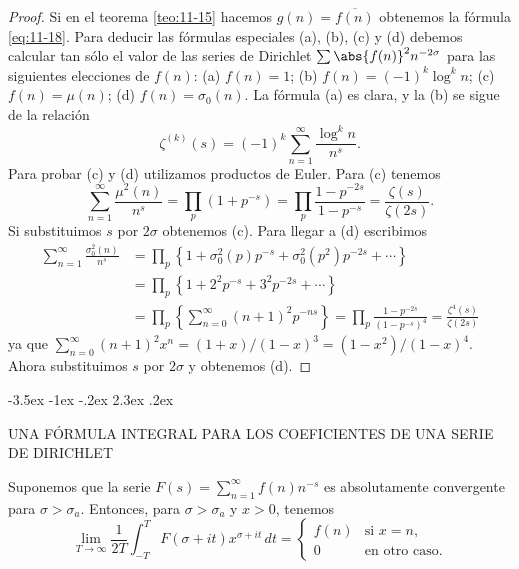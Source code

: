 \documentclass[12pt,a4paper]{book}
\makeatletter
\renewcommand\section{\@startsection{section}{1}{\z@}%
  {-3.5ex \@plus -1ex \@minus -.2ex}%
  {2.3ex \@plus .2ex}%
  {\normalfont\Large\bfseries\raggedright}}
\makeatother
\begin{document}
    \begin{proof}
        Si en el teorema \ref{teo:11-15} hacemos $g(n)=\overline{f(n)}$ obtenemos la fórmula
        \eqref{eq:11-18}. Para deducir las fórmulas especiales (a), (b), (c) y (d) debemos
        calcular tan sólo el valor de las series de Dirichlet $\sum\abs{f(n)}^{2}n^{-2\sigma}$
        para las siguientes elecciones de $f(n)$: (a) $f(n)=1$; (b) $f(n)=(-1)^{k}\log^{k}n$; (c)
        $f(n)=\mu(n)$; (d) $f(n)=\sigma_{0}(n)$. La fórmula (a) es clara, y la (b) se sigue de
        la relación
        \begin{equation*}
            \zeta^{(k)}(s)=(-1)^{k}\sum_{n=1}^{\infty}\frac{\log^{k}n}{n^{s}}.
        \end{equation*}
        Para probar (c) y (d) utilizamos productos de Euler. Para (c) tenemos
        \begin{equation*}
            \sum_{n=1}^{\infty}\frac{\mu^{2}(n)}{n^{s}}=\prod_{p}(1+p^{-s})=\prod_{p}\frac{1-p^{-2s}}{1-p^{-s}}=\frac{\zeta(s)}{\zeta(2s)}.
        \end{equation*}
        Si substituimos $s$ por $2\sigma$ obtenemos (c). Para llegar a (d) escribimos
        \begin{align*}
            \sum_{n=1}^{\infty}\frac{\sigma_{0}^{2}(n)}{n^{s}}&=\prod_{p}\left\{1+\sigma_{0}^{2}(p)p^{-s}+\sigma_{0}^{2}(p^{2})p^{-2s}+\cdots\right\}\\
            &=\prod_{p}\left\{1+2^{2}p^{-s}+3^{2}p^{-2s}+\cdots\right\}\\
            &=\prod_{p}\left\{\sum_{n=0}^{\infty}(n+1)^{2}p^{-ns}\right\}=\prod_{p}\frac{1-p^{-2s}}{(1-p^{-s})^{4}}=\frac{\zeta^{4}(s)}{\zeta(2s)}
        \end{align*}
        ya que $\sum_{n=0}^{\infty}(n+1)^{2}x^{n}=(1+x)/(1-x)^{3}=(1-x^{2})/(1-x)^{4}$. Ahora substituimos
        $s$ por $2\sigma$ y obtenemos (d).
    \end{proof}

    \section{UNA FÓRMULA INTEGRAL PARA LOS COEFICIENTES DE UNA SERIE DE DIRICHLET}

    \begin{teorema}\label{teo:11-17}
        Suponemos que la serie $F(s)=\sum_{n=1}^{\infty}f(n)n^{-s}$ es absolutamente
        convergente para $\sigma>\sigma_{a}$. Entonces, para $\sigma>\sigma_{a}$ y $x>0$,
        tenemos
        \begin{equation*}
            \lim_{T\to\infty}\frac{1}{2T}\int_{-T}^{T}F(\sigma+it)x^{\sigma+it}\,dt=
            \begin{cases}
                f(n)&\text{si }x=n,\\
                0&\text{en otro caso.}
            \end{cases}
        \end{equation*}
    \end{teorema}
\end{document}
